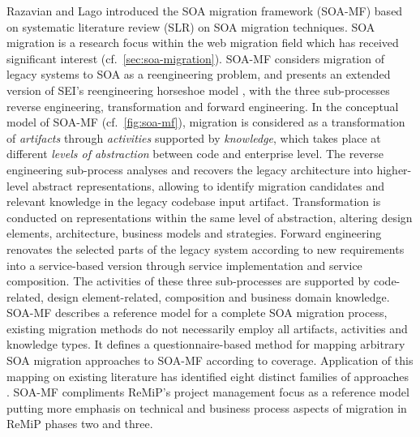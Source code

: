 Razavian and Lago introduced the SOA migration framework (SOA-MF) \autocite{Razavian2013PHD,Razavian2010SOA-MF,Razavian2010,Razavian2010SurveySOAMigration} based on systematic literature review (SLR) on SOA migration techniques.
SOA migration is a research focus within the web migration field which has received significant interest (cf.~\cref{sec:soa-migration}).
SOA-MF considers migration of legacy systems to SOA as a reengineering problem, and presents an extended version of SEI's reengineering horseshoe model \autocite{Kazman1998Horseshoe}, with the three sub-processes reverse engineering, transformation and forward engineering.
In the conceptual model of SOA-MF (cf.~\cref{fig:soa-mf}), migration is considered as a transformation of \emph{artifacts} through \emph{activities} supported by \emph{knowledge}, which takes place at different \emph{levels of abstraction} between code and enterprise level.
The reverse engineering sub-process analyses and recovers the legacy architecture into higher-level abstract representations, allowing to identify migration candidates and relevant knowledge in the legacy codebase input artifact.
Transformation is conducted on representations within the same level of abstraction, altering design elements, architecture, business models and strategies.
Forward engineering renovates the selected parts of the legacy system according to new requirements into a service-based version through service implementation and service composition.
The activities of these three sub-processes are supported by code-related, design element-related, composition and business domain knowledge.
SOA-MF describes a reference model for a complete SOA migration process, existing migration methods do not necessarily employ all artifacts, activities and knowledge types.
It defines a questionnaire-based method for mapping arbitrary SOA migration approaches to SOA-MF according to coverage.
Application of this mapping on existing literature has identified eight distinct families of approaches \autocite{Razavian2013PHD,Razavian2010SurveySOAMigration}.
SOA-MF compliments ReMiP's project management focus as a reference model putting more emphasis on technical and business process aspects of migration in ReMiP phases two and three.

